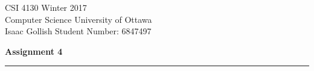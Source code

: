 \documentclass[11pt]{article}
\begin{document}
\noindent
CSI 4130 \hfill Winter 2017 \\
Computer Science \hfill University of Ottawa \\
Isaac Gollish \hfill Student Number: 6847497\\
\begin{center}
    \textbf{Assignment 4} \\
\end{center}

\hrule
\end{document}

